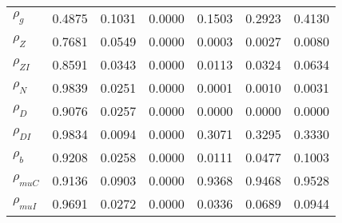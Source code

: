 \begin{center}
\begin{longtable}{lcccccc}
$ {\rho_g}             $	 & 	          0.4875	 & 	          0.1031	 & 	          0.0000	 & 	          0.1503	 & 	          0.2923	 & 	          0.4130 \\ 
$ {\rho_Z}             $	 & 	          0.7681	 & 	          0.0549	 & 	          0.0000	 & 	          0.0003	 & 	          0.0027	 & 	          0.0080 \\ 
$ {\rho_{ZI}}          $	 & 	          0.8591	 & 	          0.0343	 & 	          0.0000	 & 	          0.0113	 & 	          0.0324	 & 	          0.0634 \\ 
$ {\rho_N}             $	 & 	          0.9839	 & 	          0.0251	 & 	          0.0000	 & 	          0.0001	 & 	          0.0010	 & 	          0.0031 \\ 
$ {\rho_D}             $	 & 	          0.9076	 & 	          0.0257	 & 	          0.0000	 & 	          0.0000	 & 	          0.0000	 & 	          0.0000 \\ 
$ {\rho_{DI}}          $	 & 	          0.9834	 & 	          0.0094	 & 	          0.0000	 & 	          0.3071	 & 	          0.3295	 & 	          0.3330 \\ 
$ {\rho_b}             $	 & 	          0.9208	 & 	          0.0258	 & 	          0.0000	 & 	          0.0111	 & 	          0.0477	 & 	          0.1003 \\ 
$ {\rho_{muC}}         $	 & 	          0.9136	 & 	          0.0903	 & 	          0.0000	 & 	          0.9368	 & 	          0.9468	 & 	          0.9528 \\ 
$ {\rho_{muI}}         $	 & 	          0.9691	 & 	          0.0272	 & 	          0.0000	 & 	          0.0336	 & 	          0.0689	 & 	          0.0944 \\ 
\end{longtable}
 \end{center}
